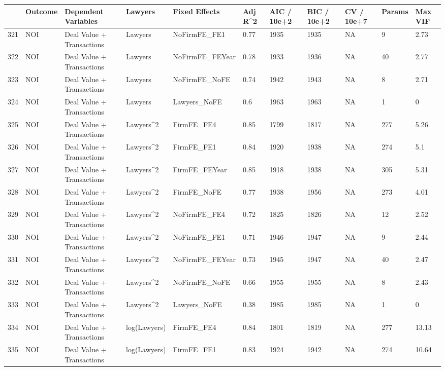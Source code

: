 \begin{table}[ht]
\centering
\begin{tabular}{rllllllllll}
  \hline
 & Outcome & Dependent Variables & Lawyers & Fixed Effects & Adj R^2 & AIC / 10e+2 & BIC / 10e+2 & CV / 10e+7 & Params & Max VIF \\ 
  \hline
321 & NOI & Deal Value + Transactions & Lawyers & NoFirmFE\_FE1 & 0.77 & 1935 & 1935 & NA & 9 & 2.73 \\ 
  322 & NOI & Deal Value + Transactions & Lawyers & NoFirmFE\_FEYear & 0.78 & 1933 & 1936 & NA & 40 & 2.77 \\ 
  323 & NOI & Deal Value + Transactions & Lawyers & NoFirmFE\_NoFE & 0.74 & 1942 & 1943 & NA & 8 & 2.71 \\ 
  324 & NOI & Deal Value + Transactions & Lawyers & Lawyers\_NoFE & 0.6 & 1963 & 1963 & NA & 1 & 0 \\ 
  325 & NOI & Deal Value + Transactions & Lawyers^2 & FirmFE\_FE4 & 0.85 & 1799 & 1817 & NA & 277 & 5.26 \\ 
  326 & NOI & Deal Value + Transactions & Lawyers^2 & FirmFE\_FE1 & 0.84 & 1920 & 1938 & NA & 274 & 5.1 \\ 
  327 & NOI & Deal Value + Transactions & Lawyers^2 & FirmFE\_FEYear & 0.85 & 1918 & 1938 & NA & 305 & 5.31 \\ 
  328 & NOI & Deal Value + Transactions & Lawyers^2 & FirmFE\_NoFE & 0.77 & 1938 & 1956 & NA & 273 & 4.01 \\ 
  329 & NOI & Deal Value + Transactions & Lawyers^2 & NoFirmFE\_FE4 & 0.72 & 1825 & 1826 & NA & 12 & 2.52 \\ 
  330 & NOI & Deal Value + Transactions & Lawyers^2 & NoFirmFE\_FE1 & 0.71 & 1946 & 1947 & NA & 9 & 2.44 \\ 
  331 & NOI & Deal Value + Transactions & Lawyers^2 & NoFirmFE\_FEYear & 0.73 & 1945 & 1947 & NA & 40 & 2.47 \\ 
  332 & NOI & Deal Value + Transactions & Lawyers^2 & NoFirmFE\_NoFE & 0.66 & 1955 & 1955 & NA & 8 & 2.43 \\ 
  333 & NOI & Deal Value + Transactions & Lawyers^2 & Lawyers\_NoFE & 0.38 & 1985 & 1985 & NA & 1 & 0 \\ 
  334 & NOI & Deal Value + Transactions & log(Lawyers) & FirmFE\_FE4 & 0.84 & 1801 & 1819 & NA & 277 & 13.13 \\ 
  335 & NOI & Deal Value + Transactions & log(Lawyers) & FirmFE\_FE1 & 0.83 & 1924 & 1942 & NA & 274 & 10.64 \\ 

\end{tabular}
\end{table}
